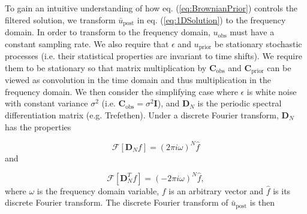 \documentclass[10pt,a4paper]{article}
\begin{document}
To gain an intuitive understanding of how eq. (\ref{eq:BrownianPrior}) controls the filtered solution, we transform $\bar{u}_\mathrm{post}$ in eq. (\ref{eq:1DSolution}) to the frequency domain.  In order to transform to the frequency domain, $u_\mathrm{obs}$ must have a constant sampling rate. We also require that $\epsilon$ and $u_\mathrm{prior}$ be stationary stochastic processes (i.e. their statistical properties are invariant to time shifts).  We require them to be stationary so that matrix multiplication by $\mathbf{C}_\mathrm{obs}$ and $\mathbf{C}_\mathrm{prior}$ can be viewed as convolution in the time domain and thus multiplication in the frequency domain.  We then consider the simplifying case where $\epsilon$ is white noise with constant variance $\sigma^2$ (i.e. $\mathbf{C}_\mathrm{obs} = \sigma^2\mathbf{I}$), and $\mathbf{D}_N$ is the periodic spectral differentiation matrix (e.g. Trefethen).  Under a discrete Fourier transform, $\mathbf{D}_N$ has the properties

\begin{equation}\label{eq:Property1}
  \mathcal{F}[\mathbf{D}_Nf] = (2\pi i\omega)^N \hat{f}
\end{equation}
and

\begin{equation}\label{eq:Property2}
  \mathcal{F}[\mathbf{D}^T_Nf] = (-2\pi i\omega)^N \hat{f},
\end{equation}
where $\omega$ is the frequency domain variable, $f$ is an arbitrary vector and $\hat{f}$ is its discrete Fourier transform.  The discrete Fourier transform of $\bar{u}_\mathrm{post}$ is then
\end{document}
